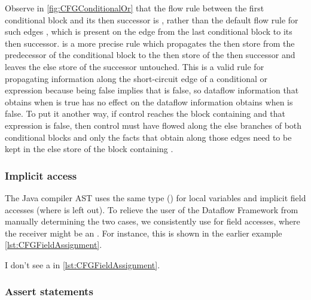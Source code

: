 Observe in \autoref{fig:CFGConditionalOr} that the flow rule between
the first conditional block and its then successor is
, rather than the default flow rule for such edges
, which is present on the edge from the last
conditional block to its then successor.   is a
more precise rule which propagates the then store from the predecessor
of the conditional block to the then store of the then successor and
leaves the else store of the successor untouched.  This is a valid
rule for propagating information along the short-circuit edge of a
conditional or expression because  being false
implies that  is false, so dataflow information that obtains
when  is true has no effect on the dataflow information
obtains when  is false.  To put it another way,
if control reaches the block containing  and
that expression is false, then control must have flowed along the else
branches of both conditional blocks and only the facts that obtain
along those edges need to be kept in the else store of the block
containing .



\subsubsection{Implicit  access}

The Java compiler AST uses the same type () for
local variables and implicit field accesses (where  is
left out).  To relieve the user of the Dataflow Framework from
manually determining the two cases, we consistently use
 for field accesses, where the receiver might be
an .  For instance, this is shown in the
earlier example \autoref{lst:CFGFieldAssignment}.

\begin{workinprogress}
I don't see a  in \autoref{lst:CFGFieldAssignment}.
\end{workinprogress}


\subsubsection{Assert statements}
\label{sec:assert-stmts}


